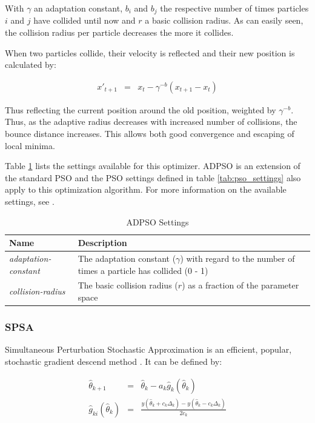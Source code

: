 \documentclass{article}
\begin{document}
With $\gamma$ an adaptation constant, $b_i$ and $b_j$ the respective number
of times particles $i$ and $j$ have collided until now and $r$ a basic collision
radius. As can easily seen, the collision radius per particle decreases
the more it collides.

When two particles collide, their velocity is reflected and their new position
is calculated by:

\begin{eqnarray*}
	x'_{t + 1} & = & x_t - \gamma^{-b}(x_{t + 1} - x_{t})
\end{eqnarray*}

Thus reflecting the current position around the old position, weighted by
$\gamma^{-b}$. Thus, as the adaptive radius decreases with increased number
of collisions, the bounce distance increases. This allows both good convergence
and escaping of local minima.

Table \ref{tab:adpso_settings} lists the settings available for this optimizer.
ADPSO is an extension of the standard PSO and the PSO settings defined in
table \ref{tab:pso_settings} also apply to this optimization algorithm. For
more information on the available settings, see .

\begin{table}[h!tb]\caption{ADPSO Settings}\label{tab:adpso_settings}\vspace{0.1in}
	\centering

	\begin{tabular}{p{4cm} p{10cm}}
		\toprule
		\textbf{Name} & \textbf{Description} \\
		\midrule
		\textit{adaptation-constant} & The adaptation constant ($\gamma$) with regard to the number
		                      of times a particle has collided (0 - 1) \\
		\textit{collision-radius} & The basic collision radius ($r$) as a fraction of the
		                   parameter space \\
		\bottomrule
	\end{tabular}
\end{table}

\subsubsection{SPSA}
Simultaneous Perturbation Stochastic Approximation is an efficient,
popular, stochastic gradient descend method \cite{spall_multivariate_1992}. It
can be defined by:

\begin{eqnarray*}
	\hat{\theta}_{k + 1} & = & \hat{\theta}_k - a_k \hat{g}_k(\hat{\theta}_k) \\
	\hat{g}_{ki}(\hat{\theta}_k) & = & \frac{y(\hat{\theta}_k + c_k \Delta_k) - 
	                                         y(\hat{\theta}_k - c_k \Delta_k)}{2 c_k}
\end{eqnarray*}
\end{document}
